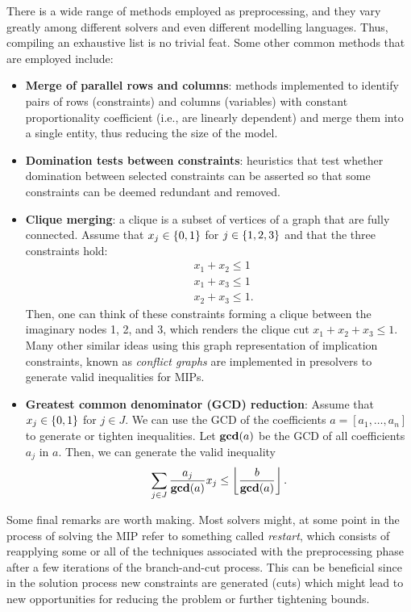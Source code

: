 There is a wide range of methods employed as preprocessing, and they vary greatly among different solvers and even different modelling languages. Thus, compiling an exhaustive list is no trivial feat. Some other common methods that are employed include:
\begin{itemize}
	\item {\bf Merge of parallel rows and columns}: methods implemented to identify pairs of rows (constraints) and columns (variables) with constant proportionality coefficient (i.e., are linearly dependent) and merge them into a single entity, thus reducing the size of the model.
	\item {\bf Domination tests between constraints}: heuristics that test whether domination between selected constraints can be asserted so that some constraints can be deemed redundant and removed. 
	\item {\bf Clique merging}: a clique is a subset of vertices of a graph that are fully connected. Assume that $x_j \in \left\{ 0,1 \right \}$ for $j \in \left\{ 1,2,3 \right \}$ and that the three constraints hold:
	\begin{align*}
		& x_1 + x_2 \le 1 \\
		& x_1 + x_3 \le 1 \\
		& x_2 + x_3 \le 1.
	\end{align*}
	Then, one can think of these constraints forming a clique between the imaginary nodes 1, 2, and 3, which renders the clique cut $x_1 + x_2 + x_3 \le 1$. Many other similar ideas using this graph representation of implication constraints, known as \emph{conflict graphs} are implemented in presolvers to generate valid inequalities for MIPs.
	\item {\bf Greatest common denominator (GCD) reduction}: Assume that $x_j \in \left\{ 0,1 \right \}$ for $j \in J$. We can use the GCD of the coefficients $a = [a_1, \dots, a_n]$ to generate or tighten inequalities. Let $\text{{\bf gcd}}(a)$ be the GCD of all coefficients $a_j$ in $a$. Then, we can generate the valid inequality
	\begin{equation*}
		\sum_{j \in J}\frac{a_j}{\text{{\bf gcd}}(a)} x_j\leq \left\lfloor\frac{b}{\text{{\bf gcd}}(a)}\right \rfloor.
	\end{equation*}
\end{itemize}

 
Some final remarks are worth making. Most solvers might, at some point in the process of solving the MIP refer to something called \emph{restart}, which consists of reapplying some or all of the techniques associated with the preprocessing phase after a few iterations of the branch-and-cut process. This can be beneficial since in the solution process new constraints are generated (cuts) which might lead to new opportunities for reducing the problem or further tightening bounds.

